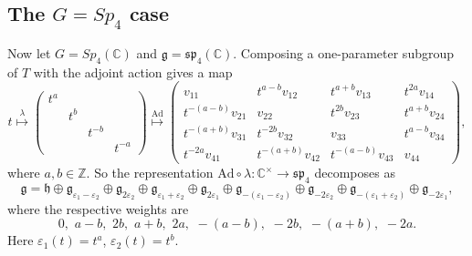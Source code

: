 \documentclass[12pt]{amsart}
\newcommand{\C}{\mathbb{C}}
\newcommand{\g}{\mathfrak{g}}
\newcommand{\h}{\mathfrak{h}}
\theoremstyle{remark}
\theoremstyle{remark}
\theoremstyle{remark}
\begin{document}
\subsection{The $G = Sp_4$ case}
Now let $G = Sp_4(\C)$ and $\mathfrak{g} = \mathfrak{sp}_4(\C)$.
Composing a one-parameter subgroup of $T$ with the adjoint action gives a map
$$t 
\overset{\lambda}{\mapsto} 
\begin{pmatrix} 
	t^a & & & \\ 
	& t^b & & \\ 
	& & t^{-b} & \\
	& & & t^{-a} 
\end{pmatrix}
\overset{\mathrm{Ad}}{\mapsto} 
\begin{pmatrix} 
	v_{11} & t^{a-b} v_{12} & t^{a+b} v_{13} & t^{2a} v_{14} \\ 
	t^{-(a-b)} v_{21} & v_{22} & t^{2b} v_{23} & t^{a+b} v_{24} \\ 
	t^{-(a+b)} v_{31} & t^{-2b} v_{32} & v_{33} & t^{a-b} v_{34} \\
	t^{-2a} v_{41} & t^{-(a+b)} v_{42} & t^{-(a-b)} v_{43} & v_{44}
\end{pmatrix},$$
where $a, b \in \mathbb{Z}$.
So the representation $\mathrm{Ad} \circ \lambda : \C^\times \to \mathfrak{sp}_4$ decomposes as
$$
\mathfrak{g} 
= \h \oplus \g_{\varepsilon_1-\varepsilon_2} \oplus \g_{2 \varepsilon_2} \oplus \g_{\varepsilon_1+\varepsilon_2} \oplus \g_{2\varepsilon_1} 
\oplus \g_{-(\varepsilon_1-\varepsilon_2)} \oplus \g_{-2 \varepsilon_2} \oplus \g_{-(\varepsilon_1+\varepsilon_2)} \oplus \g_{-2\varepsilon_1}, 
$$
where the respective weights are
$$0, \,\, a-b, \,\, 2b, \,\, a+b, \,\, 2a, \,\, -(a-b), \,\, -2b, \,\, -(a+b), \,\, -2a.$$
Here $\varepsilon_1(t) = t^{a}$, $\varepsilon_2(t) = t^{b}$.
\end{document}
